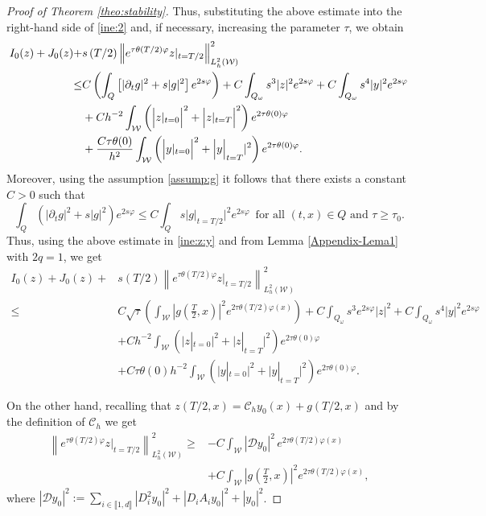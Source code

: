 \documentclass{amsart}
\numberwithin{equation}{section}
\begin{document}
\begin{proof}[Proof of Theorem \ref{theo:stability}]
Thus, substituting the above estimate into the right-hand side of \eqref{ine:2} and, if necessary, increasing the parameter $\tau$, we obtain
\begin{align}
I_{0}(z)+J_{0}(z)+&s\left(T/2\right)\left\|e^{\tau\theta(T/2)\varphi}z|_{t=T/2}\right\|_{L^2_h(\mathcal{W})}^2\notag\\
\leq& C\left(\int_{Q}\left[|\partial_{t}g|^{2}+s|g|^{2}\right]e^{2s\varphi} \right)+C\int_{Q_{\omega}}s^{3}|z|^{2}e^{2s\varphi}+C\int_{Q_{\omega}}s^{4}|y|^{2}e^{2s\varphi}\notag\\
&+Ch^{-2}\int_{\mathcal{W}}\left(\Big|z|_{t=0}\Big|^{2}+\Big|z|_{t=T}\Big|^{2}\right)e^{2\tau\theta(0)\varphi}\label{ine:z:y}\\
&+\frac{C\tau\theta(0)}{h^{2}}\int_{\mathcal{W}}\left(\Big|y|_{t=0}\Big|^{2}+\Big|y\Big|_{t=T}|^{2}\right)e^{2\tau\theta(0)\varphi}\notag.
\end{align}
Moreover, using the assumption \eqref{assump:g} it follows that there exists a constant $C>0$ such that
     \begin{equation*}
\int_{Q}\left(|\partial_{t}g|^{2}+s|g|^{2}\right)e^{2s\varphi}\leq C\int_{Q}s\Big|g|_{t=T/2}\Big|^{2}e^{2s\varphi}\, \mbox{ for all }(t,x)\in Q \mbox{ and }\tau\geq \tau_{0}.
     \end{equation*}
Thus, using the above estimate in \eqref{ine:z:y} 
    and from Lemma \ref{Appendix-Lema1} with $2q=1$, we get
    \begin{equation}\label{ine:y:z:2}
        \begin{aligned}
         I_{0}(z)+J_{0}(z)+&s\left(T/2\right)\left\|e^{\tau\theta(T/2)\varphi}z|_{t=T/2}\right\|_{L^2_h(\mathcal{W})}^2\\
         \leq&   C\sqrt{\tau}\left(\int_{{\mathcal{W}}}\left|g\left( \frac{T}{2},x\right)\right|^{2}e^{2\tau\theta(T/2)\varphi(x)} \right)+C\int_{Q_{\omega}}s^{3}e^{2s\varphi}|z|^{2}+C\int_{Q_{ \omega}}s^{4}|y|^{2}e^{2s\varphi}\\
&+Ch^{-2}\int_{\mathcal{W}}\left(\Big|z|_{t=0}\Big|^{2}+\Big|z|_{t=T}\Big|^{2}\right)e^{2\tau\theta(0)\varphi}\\
&+C\tau\theta(0)h^{-2}\int_{\mathcal{W}}\left(\Big|y|_{t=0}\Big|^{2}+\Big|y|_{t=T}\Big|^{2}\right)e^{2\tau\theta(0)\varphi}.
        \end{aligned}
    \end{equation}
\par On the other hand, recalling that $z(T/2,x)=\mathcal{C}_{h}y_{0}(x)+g(T/2,x)$ 
 and by the definition of $\mathcal{C}_{h}$ we get 
  \begin{equation}\label{ine:almost}
  \begin{aligned}
    \left\|e^{\tau\theta(T/2)\varphi}z|_{t=T/2}\right\|_{L^2_h(\mathcal{W})}^2 \geq &-C\int_{\mathcal{W}}|\mathcal{D}y_{0}|^2\,e^{2\tau\theta(T/2)\varphi(x)}\\
   &+C\int_{\mathcal{W}}\left| g\left( \frac{T}{2},x\right)\right|^{2}e^{2\tau\theta(T/2)\varphi(x)},
   \end{aligned}
  \end{equation}
  where $|\mathcal{D} y_{0}|^2:= \sum_{i\in\llbracket 1,d\rrbracket} |D_{i}^{2}y_{0}|^{2}+|D_{i}A_{i}y_{0}|^{2}+|y_{0}|^{2}$.



\end{proof}
\end{document}
